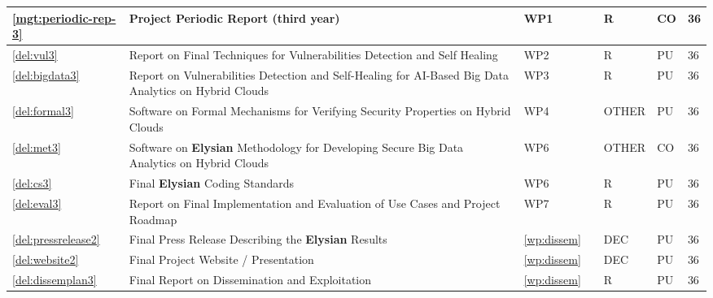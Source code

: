 \documentclass[a4paper,11pt]{article}
\newcommand{\project}[1]{\textbf{#1}\xspace}
\newcommand{\SECURITY}{\project{Elysian}}
\newcommand{\TheProject}{\SECURITY}
\begin{document}
\begin{minipage}{\textwidth}
\begin{center}
\begin{tabular}{|p{0.8cm}|p{9.65cm}|p{0.8cm}|p{1.15cm}|p{1.2cm}|p{0.8cm}|p{0.8cm}|}
\hline \ref{mgt:periodic-rep-3} & Project Periodic Report (third year) & WP1 & \coordshort{} & R & CO & 36 \\
\hline \ref{del:vul3} & Report on Final Techniques for Vulnerabilities Detection and Self Healing & WP2 & \IBMshort{} & R & PU & 36 \\
\hline \ref{del:bigdata3} & Report on Vulnerabilities Detection and Self-Healing for AI-Based Big Data Analytics on Hybrid Clouds & WP3 & \SCCHshort{} & R & PU & 36 \\
\hline \ref{del:formal3} & Software on Formal Mechanisms for Verifying Security Properties on Hybrid Clouds & WP4 & \SA{} & OTHER & PU & 36 \\
\hline \ref{del:met3} & Software on \TheProject{} Methodology for Developing Secure Big Data Analytics on Hybrid Clouds & WP6 & \YAGshort{} & OTHER & CO & 36 \\
\hline \ref{del:cs3} & Final \TheProject{} Coding Standards & WP6 & \UCMshort{} & R & PU & 36 \\
\hline \ref{del:eval3} & Report on Final Implementation and Evaluation of Use Cases and Project Roadmap & WP7 & \FRQshort{} & R & PU & 36 \\
\hline \ref{del:pressrelease2} & Final Press Release Describing the \TheProject{} Results & \ref{wp:dissem} & \SAshort{} & DEC & PU & 36 \\
\hline \ref{del:website2} & Final Project Website / Presentation & \ref{wp:dissem} & \UODshort{} & DEC & PU & 36 \\
\hline \ref{del:dissemplan3} & Final Report on Dissemination and Exploitation & \ref{wp:dissem} & \UODshort{} & R & PU &  36 \\

\hline
\end{tabular}
\end{center}
\end{minipage}








\bigskip\bigskip\bigskip
\pagebreak
{}
\end{document}
